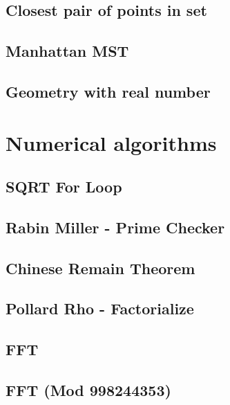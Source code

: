 \subsection{Closest pair of points in set}
\raggedbottom
\hrulefill
\subsection{Manhattan MST}
\raggedbottom
\hrulefill
\subsection{Geometry with real number}
\raggedbottom
\hrulefill

\section{Numerical algorithms}
\subsection{SQRT For Loop}
\raggedbottom
\hrulefill
\subsection{Rabin Miller - Prime Checker}
\raggedbottom
\hrulefill
\subsection{Chinese Remain Theorem}
\raggedbottom
\hrulefill
\subsection{Pollard Rho - Factorialize}
\raggedbottom
\hrulefill
\subsection{FFT}
\raggedbottom
\hrulefill
\subsection{FFT (Mod 998244353)}
\raggedbottom
\hrulefill
